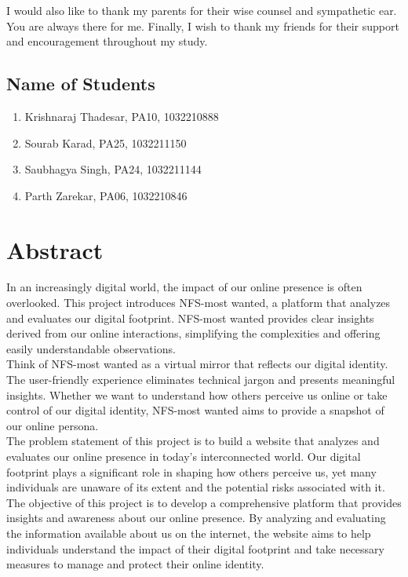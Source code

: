 \documentclass[openany]{report}
\begin{document}
I would also like to thank my parents for their wise counsel and sympathetic ear. You are always there for me. Finally, I wish to thank my friends for their support and encouragement throughout my study.

\section*{Name of Students}
\begin{enumerate}
    \item Krishnaraj Thadesar, PA10, 1032210888
    \item Sourab Karad, PA25, 1032211150
    \item Saubhagya Singh, PA24, 1032211144
    \item Parth Zarekar, PA06, 1032210846
\end{enumerate}

\thispagestyle{empty}
\clearpage

\chapter*{Abstract}
\thispagestyle{empty}

In an increasingly digital world, the impact of our online presence is often overlooked. This project introduces NFS-most wanted, a platform that analyzes and evaluates our digital footprint. NFS-most wanted provides clear insights derived from our online interactions, simplifying the complexities and offering easily understandable observations.\\

Think of NFS-most wanted as a virtual mirror that reflects our digital identity. The user-friendly experience eliminates technical jargon and presents meaningful insights. Whether we want to understand how others perceive us online or take control of our digital identity, NFS-most wanted aims to provide a snapshot of our online persona.\\

The problem statement of this project is to build a website that analyzes and evaluates our online presence in today's interconnected world. Our digital footprint plays a significant role in shaping how others perceive us, yet many individuals are unaware of its extent and the potential risks associated with it.\\

The objective of this project is to develop a comprehensive platform that provides insights and awareness about our online presence. By analyzing and evaluating the information available about us on the internet, the website aims to help individuals understand the impact of their digital footprint and take necessary measures to manage and protect their online identity.\\
\end{document}
